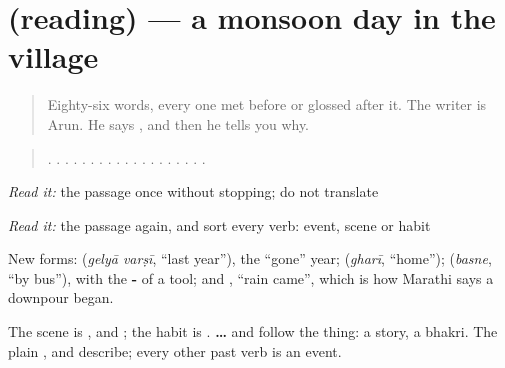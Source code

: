 \section[(reading)]{(reading) — a monsoon day in the village}

\label{lesson:MR-C279-pavsalyatla-divas}



\begin{quote}
Eighty-six words, every one met before or glossed after it. The writer is Arun. He says \textbf{     }, and then he tells you why.
\end{quote}

\begin{tcolorbox}[breakable,skin=enhanced,colback=orange!6,colframe=orange!45!black,boxrule=0.5pt,arc=1mm,left=6pt,right=6pt,top=4pt,bottom=4pt,fonttitle=\bfseries,title={Read this}]
\begin{quote}
     .      .     .    .     .    .   .      .   .      .    .    .     .   .     .    .    .    .     .
\end{quote}

\emph{Read it:} the passage once without stopping; do not translate

\emph{Read it:} the passage again, and sort every verb: event, scene or habit
\end{tcolorbox}

\begin{culture}
New forms: \textbf{ } (\emph{gelyā varṣī}, \textquotedblleft{}last year\textquotedblright{}), the \textquotedblleft{}gone\textquotedblright{} year; \textbf{} (\emph{gharī}, \textquotedblleft{}home\textquotedblright{}); \textbf{} (\emph{basne}, \textquotedblleft{}by bus\textquotedblright{}), with the \textbf{-} of a tool; and \textbf{ }, \textquotedblleft{}rain came\textquotedblright{}, which is how Marathi says a downpour began.

The scene is \textbf{ }, \textbf{ } and \textbf{ }; the habit is \textbf{}. \textbf{ … } and \textbf{  } follow the thing: a story, a bhakri. The plain \textbf{}, \textbf{} and \textbf{} describe; every other past verb is an event.
\end{culture}

